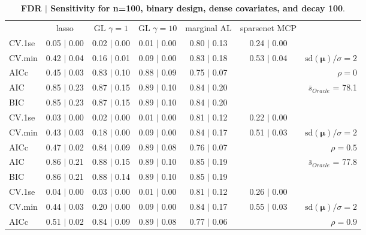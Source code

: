 \clearpage
\begin{table}\vspace{-.5cm}
\caption[l]{ {\it }
{ \bf FDR $\boldsymbol{\mid}$ Sensitivity for n=100, binary design, dense covariates, and  decay  100}.}
\vspace{-.5cm}
\footnotesize{}
\begin{center}
\begin{tabular}{l*{5}{c}|r}
 & lasso & GL $\gamma=1$ & GL $\gamma=10$ & marginal AL & sparsenet MCP  & \\
 \cline{1-7}
CV.1se & 0.05 $\mid$ 0.00 & 0.02 $\mid$ 0.00 & 0.01 $\mid$ 0.00 & 0.80 $\mid$ 0.13 & 0.24 $\mid$ 0.00 & \\
CV.min & 0.42 $\mid$ 0.04 & 0.16 $\mid$ 0.01 & 0.09 $\mid$ 0.00 & 0.83 $\mid$ 0.18 & 0.53 $\mid$ 0.04 &  $\mathrm{sd}(\mathbf{\mu})/\sigma=2$ \\
AICc & 0.45 $\mid$ 0.03 & 0.83 $\mid$ 0.10 & 0.88 $\mid$ 0.09 & 0.75 $\mid$ 0.07 & & $\rho=0$ \\
AIC & 0.85 $\mid$ 0.23 & 0.87 $\mid$ 0.15 & 0.89 $\mid$ 0.10 & 0.84 $\mid$ 0.20 & &  \multirow{2}{*}{$\bar{s}_{Oracle}$ = 78.1} \\
BIC & 0.85 $\mid$ 0.23 & 0.87 $\mid$ 0.15 & 0.89 $\mid$ 0.10 & 0.84 $\mid$ 0.20 & &  \\
 \hline 
CV.1se & 0.03 $\mid$ 0.00 & 0.02 $\mid$ 0.00 & 0.01 $\mid$ 0.00 & 0.81 $\mid$ 0.12 & 0.22 $\mid$ 0.00 & \\
CV.min & 0.43 $\mid$ 0.03 & 0.18 $\mid$ 0.00 & 0.09 $\mid$ 0.00 & 0.84 $\mid$ 0.17 & 0.51 $\mid$ 0.03 &  $\mathrm{sd}(\mathbf{\mu})/\sigma=2$ \\
AICc & 0.47 $\mid$ 0.02 & 0.84 $\mid$ 0.09 & 0.89 $\mid$ 0.08 & 0.76 $\mid$ 0.07 & & $\rho=0.5$ \\
AIC & 0.86 $\mid$ 0.21 & 0.88 $\mid$ 0.15 & 0.89 $\mid$ 0.10 & 0.85 $\mid$ 0.19 & &  \multirow{2}{*}{$\bar{s}_{Oracle}$ = 77.8} \\
BIC & 0.86 $\mid$ 0.21 & 0.88 $\mid$ 0.14 & 0.89 $\mid$ 0.10 & 0.85 $\mid$ 0.19 & &  \\
 \hline 
CV.1se & 0.04 $\mid$ 0.00 & 0.03 $\mid$ 0.00 & 0.01 $\mid$ 0.00 & 0.81 $\mid$ 0.12 & 0.26 $\mid$ 0.00 & \\
CV.min & 0.44 $\mid$ 0.03 & 0.20 $\mid$ 0.00 & 0.09 $\mid$ 0.00 & 0.84 $\mid$ 0.17 & 0.55 $\mid$ 0.03 &  $\mathrm{sd}(\mathbf{\mu})/\sigma=2$ \\
AICc & 0.51 $\mid$ 0.02 & 0.84 $\mid$ 0.09 & 0.89 $\mid$ 0.08 & 0.77 $\mid$ 0.06 & & $\rho=0.9$ \\

\end{tabular}
\end{center}
\end{table}
